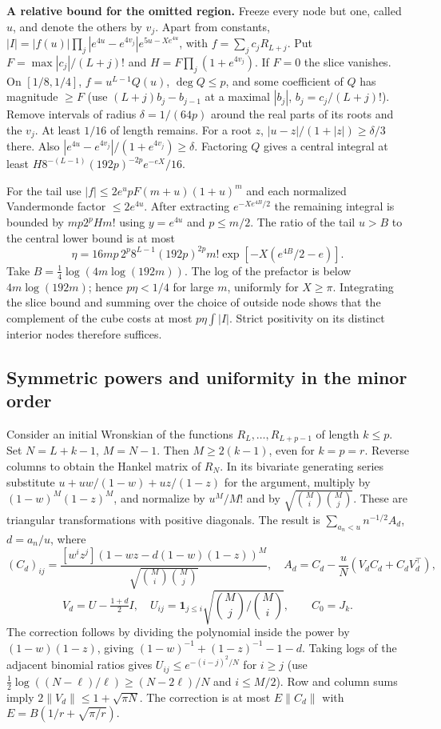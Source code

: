 \documentclass[11pt,a4paper,reqno]{amsart}
\numberwithin{equation}{section}
\begin{document}
\textbf{A relative bound for the omitted region.} Freeze every node but one, called \(u\), and denote the others by \(v_j\). Apart from constants, \(|I|=|f(u)|\prod_j|e^{4u}-e^{4v_j}|e^{5u-Xe^{4u}}\), with \(f=\sum_j c_jR_{L+j}\). Put \(F=\max |c_j|/(L+j)!\) and \(H=F\prod_j(1+e^{4v_j})\). If \(F=0\) the slice vanishes. On \([1/8,1/4]\), \(f=u^{L-1}Q(u)\), \(\deg Q\le p\), and some coefficient of \(Q\) has magnitude \(\ge F\) (use \((L+j)b_j-b_{j-1}\) at a maximal \(|b_j|\), \(b_j=c_j/(L+j)!\)). Remove intervals of radius \(\delta=1/(64p)\) around the real parts of its roots and the \(v_j\). At least \(1/16\) of length remains. For a root \(z\), \(|u-z|/(1+|z|)\ge\delta/3\) there. Also \(|e^{4u}-e^{4v_j}|/(1+e^{4v_j})\ge\delta\). Factoring \(Q\) gives a central integral at least \(H8^{-(L-1)}(192p)^{-2p}e^{-eX}/16\).

For the tail use \(|f|\le2e^u p F(m+u)(1+u)^m\) and each normalized Vandermonde factor \(\le 2e^{4u}\). After extracting \(e^{-Xe^{4B}/2}\) the remaining integral is bounded by \(mp2^p H m!\) using \(y=e^{4u}\) and \(p\le m/2\). The ratio of the tail \(u>B\) to the central lower bound is at most \[\eta=16mp\,2^p8^{L-1}(192p)^{2p}m!\exp[-X(e^{4B}/2-e)].\] Take \(B=\frac14\log(4m\log(192m))\). The log of the prefactor is below \(4m\log(192m)\); hence \(p\eta<1/4\) for large \(m\), uniformly for \(X\ge\pi\). Integrating the slice bound and summing over the choice of outside node shows that the complement of the cube costs at most \(p\eta\int |I|\). Strict positivity on its distinct interior nodes therefore suffices.

\subsection{Symmetric powers and uniformity in the minor order}\label{sec:shift}


Consider an initial Wronskian of the functions \(R_L,\ldots,R_{L+p-1}\) of length \(k\le p\). Set \(N=L+k-1\), \(M=N-1\). Then \(M\ge2(k-1)\), even for \(k=p=r\). Reverse columns to obtain the Hankel matrix of \(R_N\). In its bivariate generating series substitute \(u+uw/(1-w)+uz/(1-z)\) for the argument, multiply by \((1-w)^M(1-z)^M\), and normalize by \(u^M/M!\) and by \(\sqrt{\binom Mi\binom Mj}\). These are triangular transformations with positive diagonals. The result is \(\sum_{a_n<u} n^{-1/2} A_d\), \(d=a_n/u\), where \[ (C_d)_{ij}=\frac{[w^iz^j](1-wz-d(1-w)(1-z))^M}{\sqrt{\binom Mi\binom Mj}},\quad
 A_d=C_d-\frac{u}{N}(V_d C_d+C_dV_d^\top),\] \[V_d=U-\tfrac{1+d}{2}I,\quad U_{ij}=\mathbf1_{j\le i}\sqrt{\binom Mj/\binom Mi},\qquad C_0=J_k.\] The correction follows by dividing the polynomial inside the power by \((1-w)(1-z)\), giving \((1-w)^{-1}+(1-z)^{-1}-1-d\). Taking logs of the adjacent binomial ratios gives \(U_{ij}\le e^{-(i-j)^2/N}\) for \(i\ge j\) (use \(\frac12\log((N-\ell)/\ell)\ge(N-2\ell)/N\) and \(i\le M/2\)). Row and column sums imply \(2\|V_d\|\le1+\sqrt{\pi N}\). The correction is at most \(E\|C_d\|\) with \(E=B(1/r+\sqrt{\pi/r})\).
\end{document}
